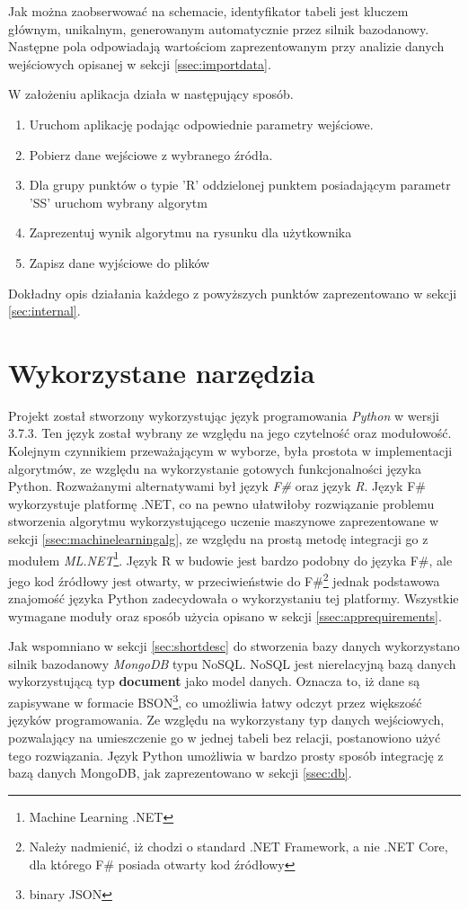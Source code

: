 Jak można zaobserwować na schemacie, identyfikator tabeli jest kluczem głównym, unikalnym, generowanym automatycznie przez silnik bazodanowy. Następne pola odpowiadają wartościom zaprezentowanym przy analizie danych wejściowych opisanej w sekcji \ref{ssec:importdata}.\par
W założeniu aplikacja działa w następujący sposób.
\begin{enumerate}
        \item Uruchom aplikację podając odpowiednie parametry wejściowe.
        \item Pobierz dane wejściowe z wybranego źródła.
        \item Dla grupy punktów o typie 'R' oddzielonej punktem posiadającym parametr 'SS' uruchom wybrany algorytm
        \item Zaprezentuj wynik algorytmu na rysunku dla użytkownika
        \item Zapisz dane wyjściowe do plików
\end{enumerate}
Dokładny opis działania każdego z powyższych punktów zaprezentowano w sekcji \ref{sec:internal}.
\section{Wykorzystane narzędzia}
\label{sec:tools}
Projekt został stworzony wykorzystując język programowania \emph{Python} \cite{Python} w wersji 3.7.3. Ten język został wybrany ze względu na jego czytelność oraz modułowość. Kolejnym czynnikiem przeważającym w wyborze, była prostota w implementacji algorytmów, ze względu na wykorzystanie gotowych funkcjonalności języka Python. Rozważanymi alternatywami był język \emph{F\#} oraz język \emph{R}. Język F\# wykorzystuje platformę .NET, co na pewno ułatwiłoby rozwiązanie problemu stworzenia algorytmu wykorzystującego uczenie maszynowe zaprezentowane w sekcji \ref{ssec:machinelearningalg}, ze względu na prostą metodę integracji go z modułem \emph{ML.NET}\footnote{Machine Learning .NET}. Język R w budowie jest bardzo podobny do języka F\#, ale jego kod źródłowy jest otwarty, w przeciwieństwie do F\#\footnote{Należy nadmienić, iż chodzi o standard .NET Framework, a nie .NET Core, dla którego F\# posiada otwarty kod źródłowy} jednak podstawowa znajomość języka Python zadecydowała o wykorzystaniu tej platformy. Wszystkie wymagane moduły oraz sposób użycia opisano w sekcji \ref{ssec:apprequirements}.\par
Jak wspomniano w sekcji \ref{sec:shortdesc} do stworzenia bazy danych wykorzystano silnik bazodanowy \emph{MongoDB} typu NoSQL. NoSQL jest nierelacyjną bazą danych wykorzystującą typ \textbf{document} jako model danych. Oznacza to, iż dane są zapisywane w formacie BSON\footnote{binary JSON}, co umożliwia łatwy odczyt przez większość języków programowania. Ze względu na wykorzystany typ danych wejściowych, pozwalający na umieszczenie go w jednej tabeli bez relacji, postanowiono użyć tego rozwiązania. Język Python umożliwia w bardzo prosty sposób integrację z bazą danych MongoDB, jak zaprezentowano w sekcji \ref{ssec:db}.

